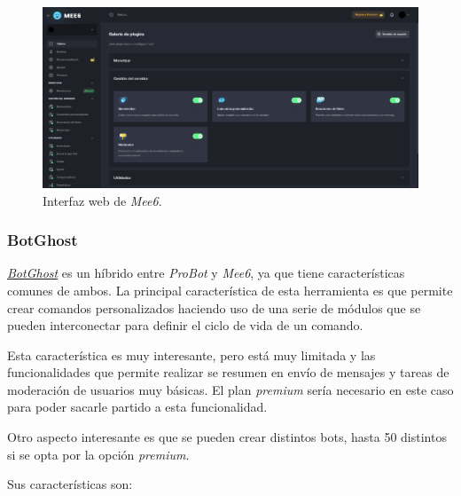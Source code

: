 \begin{figure}[H]
	\centering
	\includegraphics[width=1\textwidth]{img/mee6.png}
	\caption{Interfaz web de \textit{Mee6}.}
\end{figure}


\subsubsection{BotGhost}

\href{https://botghost.com/}{\textit{BotGhost}} es un híbrido entre \textit{ProBot} y \textit{Mee6}, ya que tiene características comunes de ambos. La principal característica de esta herramienta es que permite crear comandos personalizados haciendo uso de una serie de módulos que se pueden interconectar para definir el ciclo de vida de un comando.

Esta característica es muy interesante, pero está muy limitada y las funcionalidades que permite realizar se resumen en envío de mensajes y tareas de moderación de usuarios muy básicas. El plan \textit{premium} sería necesario en este caso para poder sacarle partido a esta funcionalidad.

Otro aspecto interesante es que se pueden crear distintos bots, hasta 50 distintos si se opta por la opción \textit{premium}.

Sus características son:

